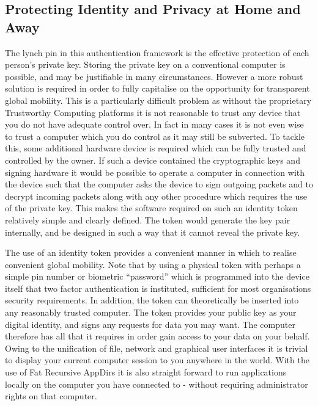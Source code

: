 \documentclass[british,english]{article}
\begin{document}
\subsection{Protecting Identity and Privacy at Home and Away}

The lynch pin in this authentication framework is the effective protection
of each person's private key. Storing the private key on a conventional
computer is possible, and may be justifiable in many circumstances.
However a more robust solution is required in order to fully capitalise
on the opportunity for transparent global mobility. This is a particularly
difficult problem as without the proprietary Trustworthy Computing
platforms it is not reasonable to trust any device that you do not
have adequate control over. In fact in many cases it is not even wise
to trust a computer which you do control as it may still be subverted.
To tackle this, some additional hardware device is required which
can be fully trusted and controlled by the owner. If such a device
contained the cryptographic keys and signing hardware it would be
possible to operate a computer in connection with the device such
that the computer asks the device to sign outgoing packets and to
decrypt incoming packets along with any other procedure which requires
the use of the private key. This makes the software required on such
an identity token relatively simple and clearly defined. The token
would generate the key pair internally, and be designed in such a
way that it cannot reveal the private key. 

The use of an identity token provides a convenient manner in which
to realise convenient global mobility. Note that by using a physical
token with perhaps a simple pin number or biometric {}``password''
which is programmed into the device itself that two factor authentication
is instituted, sufficient for most organisations security requirements.
In addition, the token can theoretically be inserted into any reasonably
trusted computer. The token provides your public key as your digital
identity, and signs any requests for data you may want. The computer
therefore has all that it requires in order gain access to your data
on your behalf. Owing to the unification of file, network and graphical
user interfaces it is trivial to display your current computer session
to you anywhere in the world. With the use of Fat Recursive AppDirs
it is also straight forward to run applications locally on the computer
you have connected to - without requiring administrator rights on
that computer.
\end{document}
